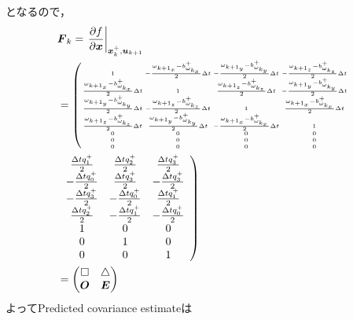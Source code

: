 となるので，
\begin{align}
  &\boldsymbol{F}_{k} = \left. \frac{\partial f}{\partial \boldsymbol{x}}\right|_{\boldsymbol{x}_{k}^{+}, \boldsymbol{u}_{k+1}}\\
  &=
  {\tiny
    \setlength\arraycolsep{1pt}
    \left(
    \begin{array}{cccc}
      1 & -\omegawithbias{x} & -\omegawithbias{y} & -\omegawithbias{z}\\
      \omegawithbias{x} & 1 & \omegawithbias{z} & -\omegawithbias{y}\\
      \omegawithbias{y} & -\omegawithbias{z} & 1 &\omegawithbias{x}\\
      \omegawithbias{z} & \omegawithbias{y} & -\omegawithbias{x} & 1\\
      0 & 0 & 0 & 0\\
      0 & 0 & 0 & 0\\
      0 & 0 & 0 & 0
    \end{array}\nonumber
    \right.
  }\\
  & \left.
  \begin{array}{ccc}
     \tmpbibun{1} &  \tmpbibun{2} &  \tmpbibun{3}\\
    -\tmpbibun{0} &  \tmpbibun{3} & -\tmpbibun{3}\\
    -\tmpbibun{3} & -\tmpbibun{0} &  \tmpbibun{1}\\
     \tmpbibun{2} & -\tmpbibun{1} & -\tmpbibun{0}\\
     1 & 0 & 0\\
     0 & 1 & 0\\
     0 & 0 & 1
  \end{array}
  \right)\\
  &=
  \begin{pmatrix}
    \Box & \triangle\\
    \boldsymbol{O} & \boldsymbol{E}
  \end{pmatrix}
\end{align}
よってPredicted covariance estimateは
